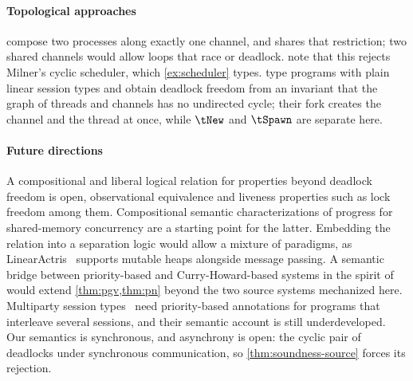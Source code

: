 \paragraph{Topological approaches}
\citet{DBLP:conf/concur/CairesP10} compose two processes along exactly
one channel, and \citet{DBLP:journals/jfp/Wadler14} shares that
restriction; two shared channels would allow loops that race or
deadlock. \citet{DardhaG18} note that this rejects Milner's cyclic
scheduler, which \cref{ex:scheduler} types.
\citet{DBLP:journals/pacmpl/JacobsBK22} type programs with plain linear
session types and obtain deadlock freedom from an invariant that the
graph of threads and channels has no undirected cycle; their fork
creates the channel and the thread at once, while $\tNew$ and $\tSpawn$
are separate here.

\paragraph{Future directions}
A compositional and liberal logical relation for properties beyond
deadlock freedom is open, observational equivalence
\cite{conf/esop/Atkey17} and liveness properties such as lock freedom
\cite{Kobayashi02,Padovani13} among them. Compositional semantic
characterizations of progress for shared-memory concurrency
\cite{DOsualdoSFG21,LiangF18,LeeLYCKH25} are a starting point for the
latter. Embedding the relation into a separation logic would allow a
mixture of paradigms, as LinearActris~\cite{JacobsHK24} supports mutable
heaps alongside message passing. A semantic bridge between
priority-based and Curry-Howard-based systems in the spirit of
\cite{DardhaP22,Jaramillo025} would extend
\cref{thm:pgv,thm:pn} beyond the two source systems mechanized here.
Multiparty session types~\cite{HondaYC16} need priority-based
annotations for programs that interleave several sessions, and their
semantic account is still underdeveloped.
Our semantics is synchronous, and asynchrony is open: the cyclic pair of
\citet{DBLP:conf/ecoop/0001DB24} deadlocks under synchronous
communication, so \cref{thm:soundness-source} forces its rejection.

